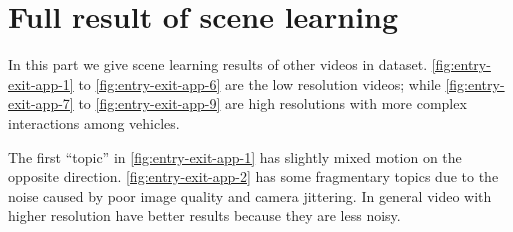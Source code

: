 \chapter{Full result of scene learning}
\label{chap:app}
In this part we give scene learning results of other videos in dataset.
\ref{fig:entry-exit-app-1} to \ref{fig:entry-exit-app-6} are the low resolution videos; while \ref{fig:entry-exit-app-7} to \ref{fig:entry-exit-app-9} are high resolutions with more complex interactions among vehicles.

The first ``topic'' in \ref{fig:entry-exit-app-1} has slightly mixed motion on the opposite direction.
\ref{fig:entry-exit-app-2} has some fragmentary topics due to the noise caused by poor image quality and camera jittering.
In general video with higher resolution have better results because they are less noisy.
